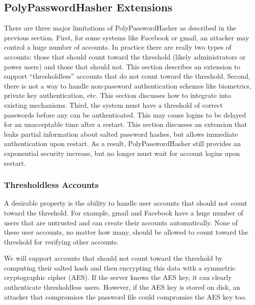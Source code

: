 \subsection{PolyPasswordHasher Extensions}
\label{sec-extensions}

There are three major limitations of PolyPasswordHasher as described in the previous
section.   
First, for some systems like Facebook or gmail, an attacker may control a
huge number of accounts.  In practice there are really two 
types of accounts: those that should count toward the threshold (likely 
administrators or power users) and those that should not.   This section
describes an extension to support ``thresholdless'' accounts that do not 
count toward the threshold.
Second, there is not a way to handle non-password authentication schemes
like biometrics, private key authentication, etc.   This section 
discusses how to integrate into existing mechanisms.   
Third, the system
must have a threshold of correct passwords before any can be authenticated.
This may cause logins to be delayed for an unacceptable time after a restart.
This section discusses an extension that leaks partial information about salted 
password hashes, but allows immediate authentication upon restart.   As a 
result, PolyPasswordHasher still provides an exponential security increase, but 
no longer must wait for account logins upon restart.




\subsubsection{Thresholdless Accounts}
\label{sec-thresholdless}

A desirable property is the ability to handle user accounts that should
not count toward the threshold.  For example, gmail and Facebook have 
a huge number of users that are untrusted and can create their accounts 
automatically.   None of these user accounts, no matter how many, should be
allowed to count toward the threshold for verifying other accounts.   

We will support accounts that should not count toward the threshold by
computing their salted hash and then encrypting this data with
a symmetric cryptographic cipher (AES).   If the server knows the AES key, 
it can clearly authenticate thresholdless users.
However, if the AES key is stored on
disk, an attacker that compromises the password file could compromise the
AES key too.   


